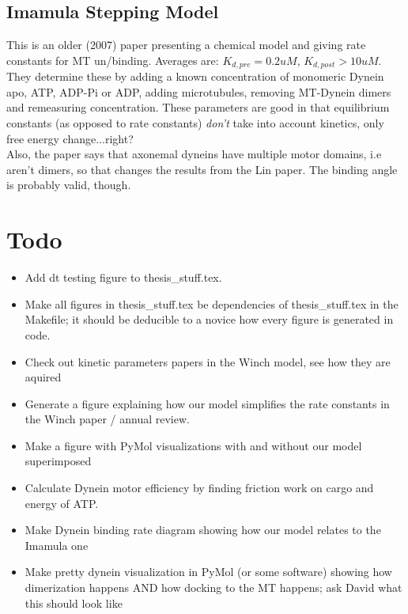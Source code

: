 \documentclass[10pt]{article} %
\begin{document}
\subsection{Imamula Stepping Model}
This is an older (2007) paper presenting a chemical model and giving rate constants for MT un/binding. Averages are: $K_{d,pre} = 0.2uM$, $K_{d,post} > 10uM$. They determine these by adding a known concentration of monomeric Dynein apo, ATP, ADP-Pi or ADP, adding microtubules, removing MT-Dynein dimers and remeasuring concentration. These parameters are good in that equilibrium constants (as opposed to rate constants) \textit{don't} take into account kinetics, only free energy change...right?\\

Also, the paper says that axonemal dyneins have multiple motor domains, i.e aren't dimers, so that changes the results from the Lin paper. The binding angle is probably valid, though.\\

\section{Todo}
\begin{itemize}
\item Add dt testing figure to thesis\_stuff.tex.
\item Make all figures in thesis\_stuff.tex be dependencies of thesis\_stuff.tex in the Makefile; it should be deducible to a novice how every figure is generated in code.
\item Check out kinetic parameters papers in the Winch model, see how they are aquired
\item Generate a figure explaining how our model simplifies the rate constants in the Winch paper / annual review.
\item Make a figure with PyMol visualizations with and without our model superimposed
\item Calculate Dynein motor efficiency by finding friction work on cargo and energy of ATP.
\item Make Dynein binding rate diagram showing how our model relates to the Imamula one
\item Make pretty dynein visualization in PyMol (or some software) showing how dimerization happens AND how docking to the MT happens; ask David what this should look like
\end{itemize}
\end{document}
